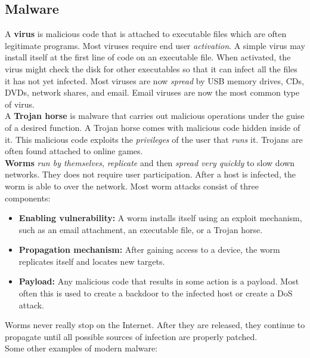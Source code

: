 \subsection{Malware}

A \textbf{virus} is malicious code that is attached to executable files which are often legitimate programs. Most viruses require end user \emph{activation}. A simple virus may install itself at the first line of code on an executable file. When activated, the virus might check the disk for other executables so that it can infect all the files it has not yet infected. Most viruses are now \emph{spread} by USB memory drives, CDs, DVDs, network shares, and email. Email viruses are now the most common type of virus.\\

A \textbf{Trojan horse} is malware that carries out malicious operations under the guise of a desired function. A Trojan horse comes with malicious code hidden inside of it. This malicious code exploits the \emph{privileges} of the user that \emph{runs} it. Trojans are often found attached to online games. \\

\textbf{Worms} \emph{run by themselves}, \emph{replicate} and then \emph{spread very quickly} to slow down networks. They does not require user participation. After a host is infected, the worm is able to  over the network. Most worm attacks consist of three components:

\begin{itemize}
\item \textbf{Enabling vulnerability:} A worm installs itself using an exploit mechanism, such as an email attachment, an executable file, or a Trojan horse.
\item \textbf{Propagation mechanism:} After gaining access to a device, the worm replicates itself and locates new targets.
\item \textbf{Payload:} Any malicious code that results in some action is a payload. Most often this is used to create a backdoor to the infected host or create a DoS attack.
\end{itemize}

\note Worms never really stop on the Internet. After they are released, they continue to propagate until all possible sources of infection are properly patched.\\

Some other examples of modern malware:

